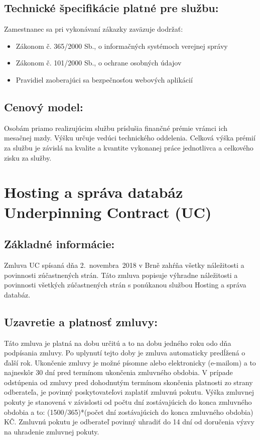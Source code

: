 \documentclass[a4paper, 11pt]{article}
\begin{document}
\begin{center}
\subsection*{Technické špecifikácie platné pre službu:}
Zamestnanec sa pri vykonávaní zákazky zaväzuje dodržať:
\begin{itemize}
\item Zákonom č. 365/2000 Sb., o informačných systémoch verejnej správy
\item Zákonom č. 101/2000 Sb., o ochrane osobných údajov
\item Pravidiel zaoberajúci sa bezpečnosťou webových aplikácií
\end{itemize}

\subsection*{Cenový model:}
Osobám priamo realizujúcim službu príslušia finančné prémie vrámci ich mesačnej mzdy. Výšku určuje vedúci technického oddelenia. Celková výška prémií za službu je závislá na kvalite a kvantite vykonanej práce jednotlivca a celkového zisku za služby.

\hfill
\section*{ \Large Hosting a správa databáz \\ Underpinning Contract (UC)}
\hfill
\subsection*{Základné informácie:}
Zmluva UC spísaná dňa 2.~novembra~2018 v Brně zahŕňa všetky náležitosti a povinnosti zúčastnených strán. Táto zmluva popisuje výhradne náležitosti a povinnosti všetkých zúčastnených strán s ponúkanou službou Hosting a správa databáz.

\subsection*{Uzavretie a platnosť zmluvy:}
Táto zmluva je platná na dobu určitú a to na dobu jedného roku odo dňa podpísania zmluvy. Po uplynutí tejto doby je zmluva automaticky predĺžená o ďalší rok. Ukončenie zmluvy je možné písomne alebo elektronicky (e-mailom) a to najneskôr 30 dní pred termínom ukončenia zmluvného obdobia. V prípade odstúpenia od zmluvy pred dohodnutým termínom skončenia platnosti zo strany odberateľa, je povinný poskytovateľovi zaplatiť zmluvnú pokutu. Výška zmluvnej pokuty je stanovená v závislosti od počtu dní zostávajúcich do konca zmluvného obdobia a to: (1500/365)*(počet dní zostávajúcich do konca zmluvného obdobia) KČ. Zmluvnú pokutu je odberateľ povinný uhradiť do 14 dní od doručenia výzvy na uhradenie zmluvnej pokuty.


\end{center}
\end{document}
